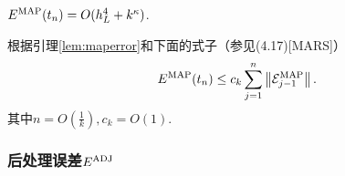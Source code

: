 \begin{prop}\label{lem:e_map}
  $E^{\textmd{MAP}}(t_n)=O(h_L^4+k^\kappa)$.
\end{prop}
\begin{pro}
根据引理\ref{lem:maperror}和下面的式子（参见(4.17)[MARS]）
\begin{equation}
  E^{\textmd{MAP}}(t_n)\leq c_k\sum_{j=1}^{n}\left\lVert
    {\cal E}^\textmd{MAP}_{j-1}\right \rVert.
\end{equation}
其中$n=O\left(\frac{1}{k}\right),c_k=O(1).$
  
\end{pro}

\subsubsection{后处理误差$E^{\textmd{ADJ}}$}


